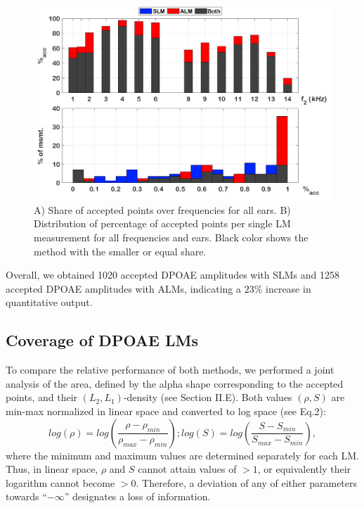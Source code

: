 \documentclass[journal,twoside,web]{ieeecolor2}
\begin{document}
\begin{figure}[ht]
\centerline{\includegraphics[width=\columnwidth]{Fig_Efficiency_v3.png}}
\caption{A) Share of accepted points over frequencies for all ears. B) Distribution of percentage of accepted points per single LM measurement for all frequencies and ears. Black color shows the method with the smaller or equal share.}
\label{fig_EFF}
\end{figure}

Overall, we obtained 1020 accepted DPOAE amplitudes with SLMs and 1258 accepted DPOAE amplitudes with ALMs, indicating a $23\%$ increase in quantitative output.

\subsection{Coverage of DPOAE LMs}
To compare the relative performance of both methods, we performed a joint analysis of the area, defined by the alpha shape corresponding to the accepted points, and their $(L_2, L_1)$-density (see Section II.E). Both values $(\rho, S)$ are min-max normalized in linear space and converted to log space (see Eq.2):
\begin{equation} log(\rho) = log(\frac{\rho - \rho_{min}}{\rho_{max} - \rho_{min}}); log(S) = log(\frac{S - S_{min}}{S_{max} - S_{min}}), \label{eq2}\end{equation}
where the minimum and maximum values are determined separately for each LM. Thus, in linear space, $\rho$ and $S$ cannot attain values of $> 1$, or equivalently their logarithm cannot become $> 0$. Therefore, a deviation of any of either parameters towards “$-\infty$” designates a loss of information.
\end{document}

